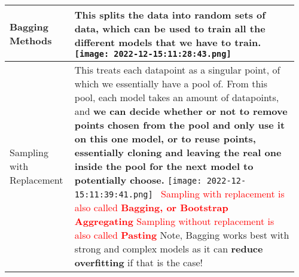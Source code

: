 \documentclass[main.tex,fontsize=8pt,paper=a4,paper=portrait,DIV=calc,]{scrartcl}
\begin{document}
\begin{table}[ht!]
\begin{tabular}{|m{0.2\linewidth}|m{0.755\linewidth}|}
\\
\hline
Bagging Methods & 
This splits the data into random sets of data, which can be used to train all the different models that we have to train.\newline
\texttt{[image: 2022-12-15:11:28:43.png]}\\
\hline
Sampling with Replacement & 
This treats each datapoint as a singular point, of which we essentially have a pool of. From this pool, each model takes an amount of datapoints, and \textbf{we can decide whether or not to remove points chosen from the pool and only use it on this one model, or to reuse points, essentially cloning and leaving the real one inside the pool for the next model to potentially choose.}\newline
\texttt{[image: 2022-12-15:11:39:41.png]} \, \newline
\textcolor{red}{Sampling with replacement is also called \textbf{Bagging, or Bootstrap Aggregating}}\newline
\textcolor{red}{Sampling without replacement is also called \textbf{Pasting}} \newline 
Note, Bagging works best with strong and complex models as it can \textbf{reduce overfitting} if that is the case!\\
\hline

\hline
\end{tabular}
\end{table}
\pagebreak
\end{document}
